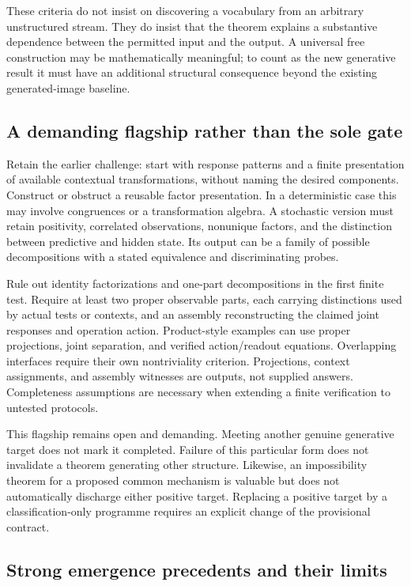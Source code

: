 \documentclass[11pt]{article}
\theoremstyle{remark}
\begin{document}
These criteria do not insist on discovering a vocabulary from an arbitrary unstructured stream. They do insist that the theorem explains a substantive dependence between the permitted input and the output. A universal free construction may be mathematically meaningful; to count as the new generative result it must have an additional structural consequence beyond the existing generated-image baseline.

\subsection{A demanding flagship rather than the sole gate}
\label{sec:flagship}

Retain the earlier challenge: start with response patterns and a finite presentation of available contextual transformations, without naming the desired components. Construct or obstruct a reusable factor presentation. In a deterministic case this may involve congruences or a transformation algebra. A stochastic version must retain positivity, correlated observations, nonunique factors, and the distinction between predictive and hidden state. Its output can be a family of possible decompositions with a stated equivalence and discriminating probes.

Rule out identity factorizations and one-part decompositions in the first finite test. Require at least two proper observable parts, each carrying distinctions used by actual tests or contexts, and an assembly reconstructing the claimed joint responses and operation action. Product-style examples can use proper projections, joint separation, and verified action/readout equations. Overlapping interfaces require their own nontriviality criterion. Projections, context assignments, and assembly witnesses are outputs, not supplied answers. Completeness assumptions are necessary when extending a finite verification to untested protocols.

This flagship remains open and demanding. Meeting another genuine generative target does not mark it completed. Failure of this particular form does not invalidate a theorem generating other structure. Likewise, an impossibility theorem for a proposed common mechanism is valuable but does not automatically discharge either positive target. Replacing a positive target by a classification-only programme requires an explicit change of the provisional contract.

\subsection{Strong emergence precedents and their limits}
\end{document}
